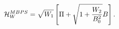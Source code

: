 \begin{equation}
\label{bpsene2}
{\cal H}_{W}^{MBPS} = \sqrt{W_1}
\left[ \Pi + \sqrt{1 + \frac{W_2}{B_0^2}} B \right].
\end{equation}

